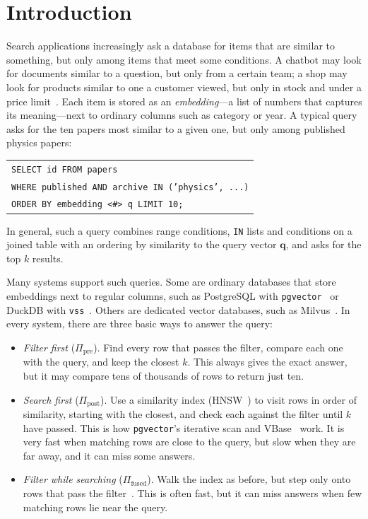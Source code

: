 \documentclass[sigconf,nonacm]{acmart}
\newcommand{\Ppre}{\Pi_{\text{pre}}}
\newcommand{\Pfus}{\Pi_{\text{fused}}}
\newcommand{\Ppost}{\Pi_{\text{post}}}
\begin{document}
\maketitle

\section{Introduction}\label{sec:intro}
Search applications increasingly ask a database for items that are similar to something, but only among items that meet some conditions. A chatbot may look for documents similar to a question, but only from a certain team; a shop may look for products similar to one a customer viewed, but only in stock and under a price limit~\cite{wei2020analyticdbv,zhang2023vbase,patel2024acorn,amanbayev2026fanns}. Each item is stored as an \emph{embedding}---a list of numbers that captures its meaning---next to ordinary columns such as category or year. A typical query asks for the ten papers most similar to a given one, but only among published physics papers:
\begin{center}
\footnotesize
\begin{tabular}{@{}l@{}}
\texttt{SELECT id FROM papers}\\
\texttt{WHERE published AND archive IN ('physics', ...)}\\
\texttt{ORDER BY embedding <\#> q LIMIT 10;}
\end{tabular}
\end{center}
In general, such a query combines range conditions, \texttt{IN} lists and conditions on a joined table with an ordering by similarity to the query vector $\mathbf{q}$, and asks for the top $k$ results.

Many systems support such queries. Some are ordinary databases that store embeddings next to regular columns, such as PostgreSQL with \texttt{pgvector}~\cite{pgvector2024} or DuckDB with \texttt{vss}~\cite{duckdbvss2024}. Others are dedicated vector databases, such as Milvus~\cite{wang2021milvus}. In every system, there are three basic ways to answer the query:
\begin{itemize}
    \item \emph{Filter first} ($\Ppre$). Find every row that passes the filter, compare each one with the query, and keep the closest $k$. This always gives the exact answer, but it may compare tens of thousands of rows to return just ten.
    \item \emph{Search first} ($\Ppost$). Use a similarity index (HNSW~\cite{malkov2018hnsw}) to visit rows in order of similarity, starting with the closest, and check each against the filter until $k$ have passed. This is how \texttt{pgvector}'s iterative scan and VBase~\cite{zhang2023vbase} work. It is very fast when matching rows are close to the query, but slow when they are far away, and it can miss some answers.
    \item \emph{Filter while searching} ($\Pfus$). Walk the index as before, but step only onto rows that pass the filter~\cite{patel2024acorn,wang2021milvus}. This is often fast, but it can miss answers when few matching rows lie near the query.
\end{itemize}
\end{document}
